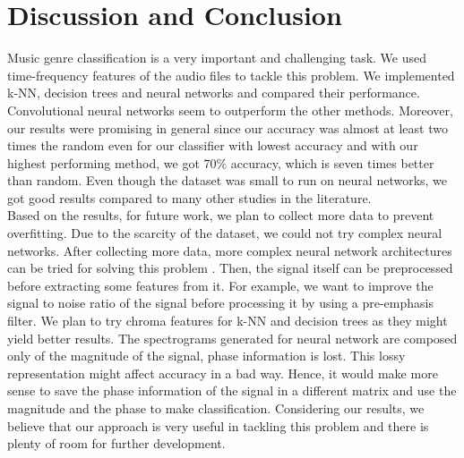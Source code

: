 \documentclass[acmtog, authorversion]{acmart}
\begin{document}
\section{Discussion and Conclusion}
Music genre classification is a very important and challenging task. We used time-frequency features of the audio files to tackle this problem. We implemented
k-NN, decision trees and neural networks and compared their performance. Convolutional neural networks seem to outperform the other methods.
 Moreover, our results were promising in general since our accuracy was almost at least two times the random even for our classifier with lowest accuracy and with our highest performing method, we got 70$\%$ accuracy, which is seven
times better than random. Even though the dataset was small to run on neural networks, we got good results compared to many other studies in the literature. \cite{mckay2004issues} \\
Based on the results, for future work, we plan to collect more data to prevent overfitting. Due to the scarcity of the dataset, we could not try complex
neural networks. After collecting more data, more complex neural network architectures can be tried for solving this problem . Then, the signal itself can be
preprocessed before extracting some features from it. For example, we want to improve the signal to noise ratio of the signal before processing it by using a pre-emphasis filter. 
We plan to try chroma features
for k-NN and decision trees as they might yield better results. The spectrograms generated for neural network are composed only of the magnitude of the signal, 
phase information is lost. This lossy representation might affect accuracy in a bad way. Hence, it would make more sense to save the phase information of the signal
in a different matrix and use the magnitude and the phase to make classification. Considering our results, we believe that our approach is very 
useful in tackling this problem and there is plenty of room for further development. 



\end{document}
